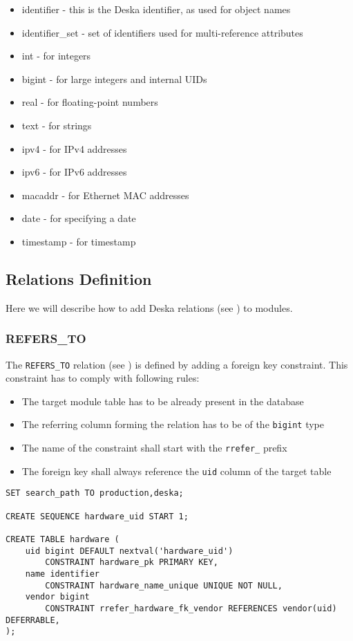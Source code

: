 \documentclass[deska]{subfiles}
\begin{document}
\begin{itemize}
	\item{identifier} - this is the Deska identifier, as used for object names
	\item{identifier\_set} - set of identifiers used for multi-reference attributes
	\item{int} - for integers
	\item{bigint} - for large integers and internal UIDs
	\item{real} - for floating-point numbers
	\item{text} - for strings
	\item{ipv4} - for IPv4 addresses
	\item{ipv6} - for IPv6 addresses
	\item{macaddr} - for Ethernet MAC addresses
	\item{date} - for specifying a date
	\item{timestamp} - for timestamp
\end{itemize}

\subsection{Relations Definition}
Here we will describe how to add Deska relations (see ) to modules.

\subsubsection{REFERS\_TO}
\label{sec:db-scheme-refers-to}

The {\tt REFERS\_TO} relation (see ) is defined by adding a foreign key constraint. This
constraint has to comply with following rules:

\begin{itemize}
    \item The target module table has to be already present in the database
    \item The referring column forming the relation has to be of the {\tt bigint} type
    \item The name of the constraint shall start with the {\tt rrefer\_} prefix
    \item The foreign key shall always reference the {\tt uid} column of the target table
\end{itemize}

\begin{verbatim}
SET search_path TO production,deska;

CREATE SEQUENCE hardware_uid START 1;

CREATE TABLE hardware (
    uid bigint DEFAULT nextval('hardware_uid')
        CONSTRAINT hardware_pk PRIMARY KEY,
    name identifier
        CONSTRAINT hardware_name_unique UNIQUE NOT NULL,
    vendor bigint 
        CONSTRAINT rrefer_hardware_fk_vendor REFERENCES vendor(uid) DEFERRABLE,
);
\end{verbatim}
\end{document}
